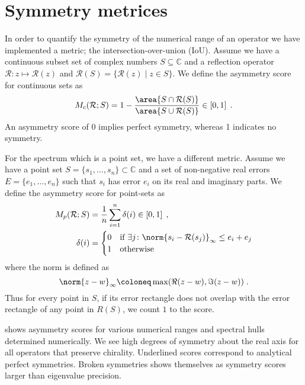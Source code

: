 \chapter{Symmetry metrices}
\label{ch:appendix:symmetries}
\label{ch:appendix:D}

In order to quantify the symmetry of the numerical range of an operator we have implemented a metric; the intersection-over-union (IoU).
Assume we have a continuous subset set of complex numbers $S \subseteq \mathbb{C}$ and a reflection operator $\mathcal{R} \colon z \mapsto \mathcal{R}(z)$ and $\mathcal{R}(S) = \{ \mathcal{R}(z) \mid z \in S \} $.
We define the asymmetry score for continuous sets as
\begin{equation} \label{eq:asymmetry:score:cont}
M_c(\mathcal{R}; S)
= 1-
\frac{\area{ S \cap \mathcal{R}(S) }}
     {\area{ S \cup \mathcal{R}(S) }}
\in \left[ 0, 1 \right] \;.
\end{equation}
An asymmetry score of \num{0} implies perfect symmetry, whereas \num{1} indicates no symmetry.

For the spectrum which is a point set, we have a different metric.
Assume we have a point set $S = \{s_1, \ldots, s_n\} \subset \mathbb{C}$ and a set of non-negative real errors $E = \{e_1, \ldots, e_n\}$ such that $s_i$ has error $e_i$ on its real and imaginary parts.
We define the asymmetry score for point-sets as
\begin{align} \label{eq:asymmetry:score:pt}
M_p(\mathcal{R}; S) &= \frac{1}{n} \sum_{i=1}^{n} \delta(i)
\in \left[ 0, 1 \right] \;, \\
\delta(i) &=
\begin{cases}
    0 & \text{if } \exists j \colon \norm{s_i - \mathcal{R}(s_j)}_{\infty} \leq e_i+e_j \\
    1 & \text{otherwise}
\end{cases}
\end{align}
where the norm is defined as
\begin{equation}
\norm{z - w}_{\infty} \coloneq \max(\Re(z - w), \Im(z - w)) \;.
\end{equation}
Thus for every point in $S$, if its error rectangle does not overlap with the error rectangle of any point in $R(S)$, we count $1$ to the score.

 shows asymmetry scores for various numerical ranges and spectral hulls determined numerically.
We see high degrees of symmetry about the real axis for all operators that preserve chirality.
Underlined scores correspond to analytical perfect symmetries.
Broken symmetries shows themselves as symmetry scores larger than eigenvalue precision.

